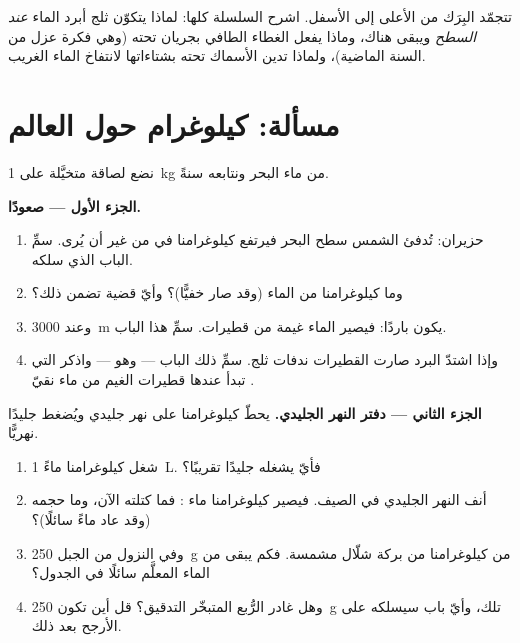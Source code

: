 \begin{exercise}[$\star\star\star$]\label{exo:g6:water-states:12}
تتجمّد البِرَك من الأعلى إلى الأسفل. اشرح السلسلة كلها: لماذا
يتكوّن ثلج أبرد الماء \emph{عند السطح} ويبقى هناك، وماذا يفعل
الغطاء الطافي بجريان  تحته (وهي فكرة عزل من السنة
الماضية)، ولماذا تدين الأسماك تحته بشتاءاتها لانتفاخ الماء
الغريب.
\end{exercise}

\section{مسألة: كيلوغرام حول العالم}

\begin{problem}\label{pb:g6:water-states:1}
نضع لصاقة متخيَّلة على \qty{1}{kg} من ماء البحر ونتابعه سنةً.

\medskip\noindent\textbf{الجزء الأول --- صعودًا.}
\begin{enumerate}
  \item حزيران: تُدفئ الشمس سطح البحر فيرتفع كيلوغرامنا في
         من غير أن يُرى. سمِّ الباب الذي سلكه.
  \item وما  كيلوغرامنا من الماء (وقد صار خفيًّا)؟ وأيّ
        قضية تضمن ذلك؟
  \item وعند \qty{3000}{m} يكون  باردًا: فيصير الماء
        غيمة من قطيرات. سمِّ هذا الباب.
  \item وإذا اشتدّ البرد صارت القطيرات ندفات ثلج. سمِّ ذلك
        الباب --- وهو  --- واذكر  التي تبدأ
        عندها قطيرات الغيم من ماء نقيّ .
\end{enumerate}

\medskip\noindent\textbf{الجزء الثاني --- دفتر النهر الجليدي.}
يحطّ كيلوغرامنا على نهر جليدي ويُضغط جليدًا نهريًّا.
\begin{enumerate}[resume]
  \item شغل كيلوغرامنا ماءً \qty{1}{L}. فأيّ  يشغله جليدًا
        تقريبًا؟
  \item {} أنف النهر الجليدي في الصيف. فيصير كيلوغرامنا ماء
        : فما كتلته الآن، وما حجمه (وقد عاد ماءً
        سائلًا)؟
  \item وفي النزول من الجبل  \qty{250}{g} من كيلوغرامنا
        من بركة شلّال مشمسة. فكم يبقى من الماء المعلَّم سائلًا
        في الجدول؟
  \item وهل غادر الرُّبع المتبخّر التدقيق؟ قل أين تكون
        \qty{250}{g} تلك، وأيّ باب سيسلكه على الأرجح
        بعد ذلك.
\end{enumerate}


\end{problem}
